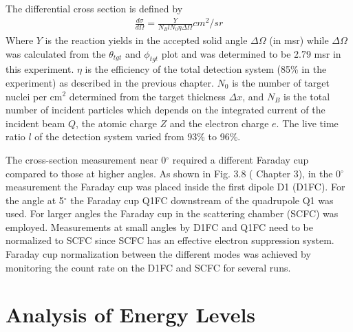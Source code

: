 The differential cross section is defined by
\begin{equation}
    \label{eq:cross_section}
    \begin{aligned}
    \frac{d\sigma}{d\Omega} = \frac{Y}{N_B l N_0 \eta \Delta \Omega}  cm^2/sr
    \end{aligned}
\end{equation}
Where $Y$ is the reaction yields in the accepted solid angle $\Delta \Omega$ (in msr) while $\Delta \Omega$ was calculated from the $\theta_{tgt}$ and $\phi_{tgt}$ plot  and was determined to be  2.79 msr in this experiment.  $\eta$ is the efficiency of the total detection system (85\% in the experiment) as described in the previous chapter.  $N_0$ is the number of target nuclei per cm$^2$ determined from the target thickness $\Delta x$, and $N_B$ is  the total number of incident particles which depends on the integrated current of the incident  beam $Q$, the atomic charge $Z$ and the electron charge $e$. The live time ratio $l$ of the detection system varied from 93\% to 96\%.

The cross-section measurement near 0$^{\circ}$  required a different Faraday cup compared to those at higher angles. As shown in Fig. 3.8 ( Chapter 3), in the  0$^{\circ}$ measurement the Faraday cup was placed inside the first dipole  D1 (D1FC).  For the angle at 5$^{\circ}$  the Faraday cup Q1FC downstream of the quadrupole  Q1 was used. For larger angles the Faraday cup in the scattering chamber (SCFC) was employed. Measurements at small angles by D1FC and Q1FC need to be normalized to SCFC since SCFC has an effective electron suppression
system. Faraday cup normalization between the different modes was achieved by monitoring the count rate on the D1FC and SCFC for several runs.







\section{Analysis of Energy Levels}

